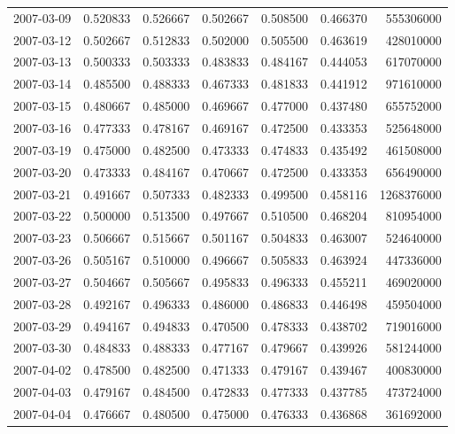 \begin{tabular}{lrrrrrr}
2007-03-09 &    0.520833 &    0.526667 &    0.502667 &    0.508500 &    0.466370 &   555306000 \\
2007-03-12 &    0.502667 &    0.512833 &    0.502000 &    0.505500 &    0.463619 &   428010000 \\
2007-03-13 &    0.500333 &    0.503333 &    0.483833 &    0.484167 &    0.444053 &   617070000 \\
2007-03-14 &    0.485500 &    0.488333 &    0.467333 &    0.481833 &    0.441912 &   971610000 \\
2007-03-15 &    0.480667 &    0.485000 &    0.469667 &    0.477000 &    0.437480 &   655752000 \\
2007-03-16 &    0.477333 &    0.478167 &    0.469167 &    0.472500 &    0.433353 &   525648000 \\
2007-03-19 &    0.475000 &    0.482500 &    0.473333 &    0.474833 &    0.435492 &   461508000 \\
2007-03-20 &    0.473333 &    0.484167 &    0.470667 &    0.472500 &    0.433353 &   656490000 \\
2007-03-21 &    0.491667 &    0.507333 &    0.482333 &    0.499500 &    0.458116 &  1268376000 \\
2007-03-22 &    0.500000 &    0.513500 &    0.497667 &    0.510500 &    0.468204 &   810954000 \\
2007-03-23 &    0.506667 &    0.515667 &    0.501167 &    0.504833 &    0.463007 &   524640000 \\
2007-03-26 &    0.505167 &    0.510000 &    0.496667 &    0.505833 &    0.463924 &   447336000 \\
2007-03-27 &    0.504667 &    0.505667 &    0.495833 &    0.496333 &    0.455211 &   469020000 \\
2007-03-28 &    0.492167 &    0.496333 &    0.486000 &    0.486833 &    0.446498 &   459504000 \\
2007-03-29 &    0.494167 &    0.494833 &    0.470500 &    0.478333 &    0.438702 &   719016000 \\
2007-03-30 &    0.484833 &    0.488333 &    0.477167 &    0.479667 &    0.439926 &   581244000 \\
2007-04-02 &    0.478500 &    0.482500 &    0.471333 &    0.479167 &    0.439467 &   400830000 \\
2007-04-03 &    0.479167 &    0.484500 &    0.472833 &    0.477333 &    0.437785 &   473724000 \\
2007-04-04 &    0.476667 &    0.480500 &    0.475000 &    0.476333 &    0.436868 &   361692000 \\

\end{tabular}

